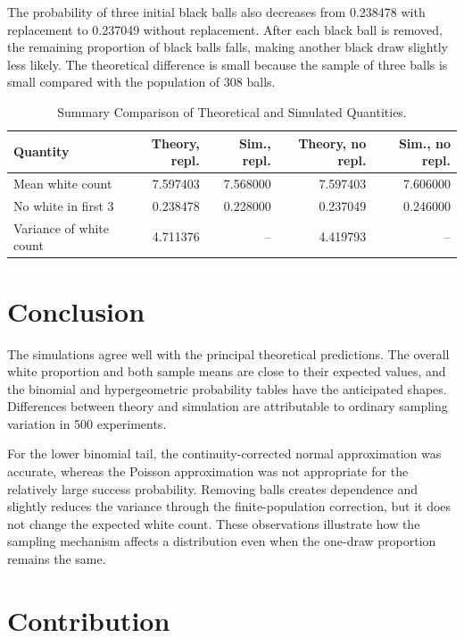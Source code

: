 \documentclass[12pt]{article}
\theoremstyle{definition}
\numberwithin{equation}{section}
\begin{document}
The probability of three initial black balls also decreases from 0.238478 with replacement to 0.237049 without replacement. After each black ball is removed, the remaining proportion of black balls falls, making another black draw slightly less likely. The theoretical difference is small because the sample of three balls is small compared with the population of 308 balls.

\begin{table}[H]
\centering
\caption{Summary Comparison of Theoretical and Simulated Quantities.}
\begin{tabular}{lrrrr}
\toprule
Quantity & Theory, repl. & Sim., repl. & Theory, no repl. & Sim., no repl.\\
\midrule
Mean white count & 7.597403 & 7.568000 & 7.597403 & 7.606000\\
No white in first 3 & 0.238478 & 0.228000 & 0.237049 & 0.246000\\
Variance of white count & 4.711376 & -- & 4.419793 & --\\
\bottomrule
\end{tabular}
\end{table}

\vfill\pagebreak

\section{Conclusion}

The simulations agree well with the principal theoretical predictions. The overall white proportion and both sample means are close to their expected values, and the binomial and hypergeometric probability tables have the anticipated shapes. Differences between theory and simulation are attributable to ordinary sampling variation in 500 experiments.

For the lower binomial tail, the continuity-corrected normal approximation was accurate, whereas the Poisson approximation was not appropriate for the relatively large success probability. Removing balls creates dependence and slightly reduces the variance through the finite-population correction, but it does not change the expected white count. These observations illustrate how the sampling mechanism affects a distribution even when the one-draw proportion remains the same.

\vfill\pagebreak

\section*{Contribution}
\end{document}
